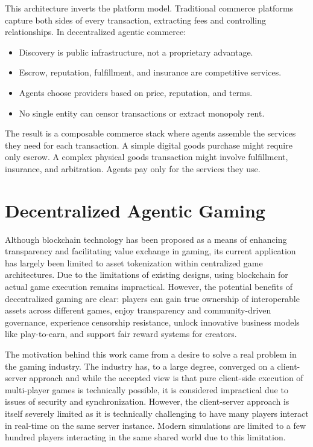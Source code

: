 \documentclass{article}
\begin{document}
This architecture inverts the platform model. Traditional commerce platforms capture both sides of every transaction, extracting fees and controlling relationships. In decentralized agentic commerce:

\begin{itemize}
    \item Discovery is public infrastructure, not a proprietary advantage.

    \item Escrow, reputation, fulfillment, and insurance are competitive services.

    \item Agents choose providers based on price, reputation, and terms.

    \item No single entity can censor transactions or extract monopoly rent.
\end{itemize}

The result is a composable commerce stack where agents assemble the services they need for each transaction. A simple digital goods purchase might require only escrow. A complex physical goods transaction might involve fulfillment, insurance, and arbitration. Agents pay only for the services they use.

\section{Decentralized Agentic Gaming}

Although blockchain technology has been proposed as a means of enhancing transparency and facilitating value exchange in gaming, its current application has largely been limited to asset tokenization within centralized game architectures. Due to the limitations of existing designs, using blockchain for actual game execution remains impractical. However, the potential benefits of decentralized gaming are clear: players can gain true ownership of interoperable assets across different games, enjoy transparency and community-driven governance, experience censorship resistance, unlock innovative business models like play-to-earn, and support fair reward systems for creators.

The motivation behind this work came from a desire to solve a real problem in the gaming industry. The industry has, to a large degree, converged on a client-server approach and while the accepted view is that pure client-side execution of multi-player games is technically possible, it is considered impractical due to issues of security and synchronization. However, the client-server approach is itself severely limited as it is technically challenging to have many players interact in real-time on the same server instance. Modern simulations are limited to a few hundred players interacting in the same shared world due to this limitation.
\end{document}

